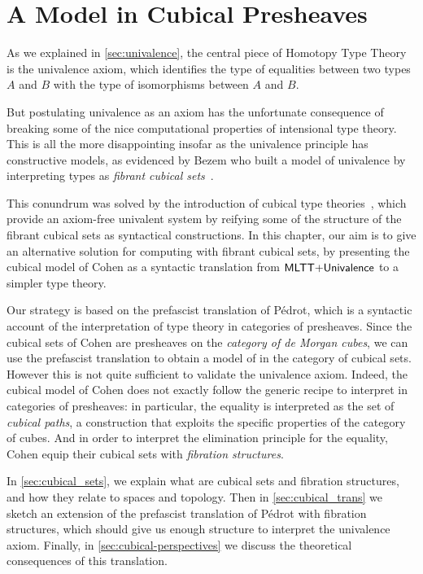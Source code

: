 \setchapterpreamble[u]{\margintoc}
\chapter{A Model in Cubical Presheaves}

As we explained in \cref{sec:univalence}, the central piece of Homotopy Type 
Theory is the univalence axiom, which identifies the type of equalities between 
two types \( A \) and \( B \) with the type of isomorphisms between \( A \) and 
\( B \).
% 

But postulating univalence as an axiom has the unfortunate consequence of 
breaking some of the nice computational properties of intensional type theory.
% 
This is all the more disappointing insofar as the univalence principle has 
constructive models, as evidenced by Bezem \etal who built a model of 
univalence by interpreting types as 
\emph{fibrant cubical sets}~.

This conundrum was solved by the introduction of cubical type 
theories~, which provide an axiom-free univalent system by 
reifying some of the structure of the fibrant cubical sets as syntactical 
constructions.
% 
In this chapter, our aim is to give an alternative solution for computing with
fibrant cubical sets, by presenting the cubical model of Cohen \etal \cite{CCHM} 
as a syntactic translation from \( \mathsf{MLTT}{+}\mathsf{Univalence} \) to a simpler 
type theory.

Our strategy is based on the prefascist translation of Pédrot, which is a 
syntactic account of the interpretation of type theory in categories
of presheaves.
% 
Since the cubical sets of Cohen \etal are presheaves on the 
\emph{category of de Morgan cubes}, we can use the prefascist translation to obtain a 
model of \MLTT in the category of cubical sets. 
% 
However this is not quite sufficient to validate the univalence axiom.
% 
Indeed, the cubical model of Cohen \etal does not exactly follow the generic
recipe to interpret \MLTT in categories of presheaves: in particular, the
equality is interpreted as the set of \emph{cubical paths}, a construction that 
exploits the specific properties of the category of cubes.
% 
And in order to interpret the elimination principle for the equality, Cohen 
\etal equip their cubical sets with \emph{fibration structures}.

% 
In \cref{sec:cubical_sets}, we explain what are cubical sets and fibration 
structures, and how they relate to spaces and topology. 
% 
Then in \cref{sec:cubical_trans} we sketch an extension of the prefascist 
translation of Pédrot with fibration structures, which should give us enough 
structure to interpret the univalence axiom.
% 
Finally, in \cref{sec:cubical-perspectives} we discuss the theoretical 
consequences of this translation.

